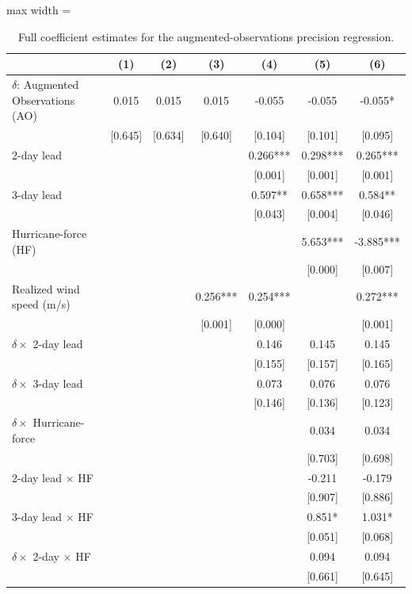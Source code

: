 \begin{table}

\caption{Full coefficient estimates for the augmented-observations precision regression. \label{tab:precision_full}}
\centering
\begin{adjustbox}{max width = \textwidth}
\begin{threeparttable}
\begin{tabular}[t]{lcccccc}
\toprule
  & (1) & (2) & (3) & (4) & (5) & (6)\\
\midrule
$\delta$: Augmented Observations (AO) & 0.015 & 0.015 & 0.015 & -0.055 & -0.055 & -0.055*\\
 & {}[0.645] & {}[0.634] & {}[0.640] & {}[0.104] & {}[0.101] & {}[0.095]\\
2-day lead &  &  &  & 0.266*** & 0.298*** & 0.265***\\
 &  &  &  & {}[0.001] & {}[0.001] & {}[0.001]\\
3-day lead &  &  &  & 0.597** & 0.658*** & 0.584**\\
 &  &  &  & {}[0.043] & {}[0.004] & {}[0.046]\\
Hurricane-force (HF) &  &  &  &  & 5.653*** & -3.885***\\
 &  &  &  &  & {}[0.000] & {}[0.007]\\
Realized wind speed (m/s) &  &  & 0.256*** & 0.254*** &  & 0.272***\\
 &  &  & {}[0.001] & {}[0.000] &  & {}[0.001]\\
$\delta \times$ 2-day lead &  &  &  & 0.146 & 0.145 & 0.145\\
 &  &  &  & {}[0.155] & {}[0.157] & {}[0.165]\\
$\delta \times$ 3-day lead &  &  &  & 0.073 & 0.076 & 0.076\\
 &  &  &  & {}[0.146] & {}[0.136] & {}[0.123]\\
$\delta \times$ Hurricane-force &  &  &  &  & 0.034 & 0.034\\
 &  &  &  &  & {}[0.703] & {}[0.698]\\
2-day lead $\times$ HF &  &  &  &  & -0.211 & -0.179\\
 &  &  &  &  & {}[0.907] & {}[0.886]\\
3-day lead $\times$ HF &  &  &  &  & 0.851* & 1.031*\\
 &  &  &  &  & {}[0.051] & {}[0.068]\\
$\delta \times$ 2-day $\times$ HF &  &  &  &  & 0.094 & 0.094\\
 &  &  &  &  & {}[0.661] & {}[0.645]\\

\end{tabular}
\end{threeparttable}
\end{adjustbox}
\end{table}
